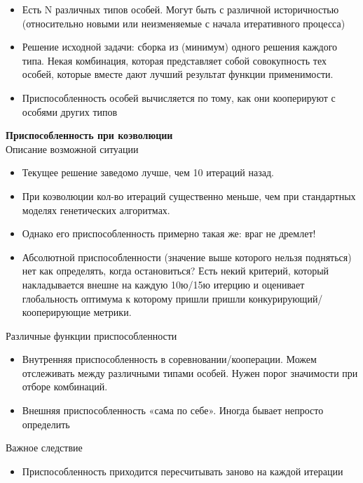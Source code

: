\begin{itemize}
    \item Есть N различных типов особей. Могут быть с различной историчностью (относительно новыми или неизменяемые с начала итеративного процесса)
    \item Решение исходной задачи: сборка из (минимум) одного решения каждого типа. Некая комбинация, которая представляет собой совокупность  тех особей, которые вместе дают лучший результат функции применимости.
    \item Приспособленность особей вычисляется по тому, как они кооперируют с особями других типов
\end{itemize}
\textbf{Приспособленность при коэволюции}\\
Описание возможной ситуации
\begin{itemize}
    \item Текущее решение заведомо лучше, чем 10 итераций назад. 
    \item При коэволюции кол-во итераций существенно меньше, чем при стандартных моделях генетических алгоритмах.
    \item Однако его приспособленность примерно такая же: враг не дремлет!
    \item Абсолютной приспособленности (значение выше которого нельзя подняться) нет как определять, когда остановиться? Есть некий критерий, который накладывается внешне на каждую 10ю/15ю итерцию и оценивает глобальность оптимума к которому пришли пришли конкурирующий/кооперирующие метрики.
\end{itemize}
Различные функции приспособленности
\begin{itemize}
    \item Внутренняя приспособленность в соревновании/кооперации. Можем отслеживать между различными типами особей. Нужен порог значимости при отборе комбинаций.
    \item Внешняя приспособленность «сама по себе». Иногда бывает непросто определить
\end{itemize}
Важное следствие
\begin{itemize}
    \item Приспособленность приходится пересчитывать заново на каждой итерации
\end{itemize}
